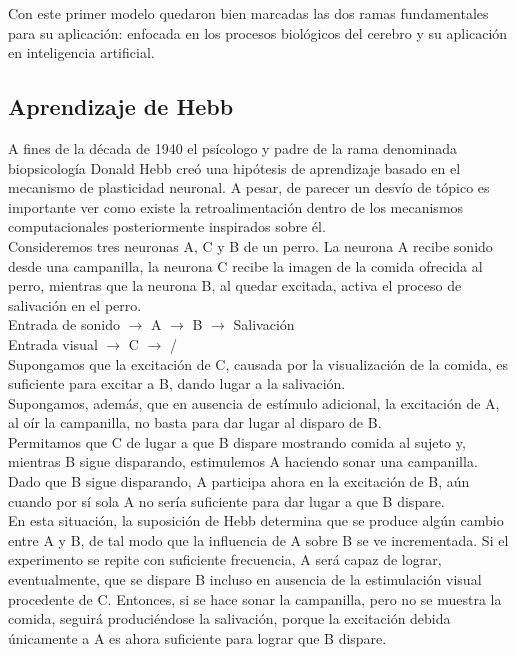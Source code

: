 \documentclass{llncs}
\begin{document}
Con este primer modelo quedaron bien marcadas las dos ramas fundamentales para su aplicaci\'on: enfocada en los
procesos biol\'ogicos del cerebro y su aplicaci\'on en inteligencia artificial. \\

\subsection{Aprendizaje de Hebb}

A fines de la d\'ecada de 1940 el ps\'icologo y padre de la rama denominada biopsicolog\'ia Donald Hebb cre\'o una hip\'otesis
de aprendizaje basado en el mecanismo de plasticidad neuronal. A pesar, de parecer un desv\'io de t\'opico es importante ver
como existe la retroalimentaci\'on dentro de los mecanismos computacionales posteriormente inspirados sobre \'el.\\

Consideremos tres neuronas A, C y B de un perro. La neurona A recibe sonido desde una campanilla, la neurona C recibe la
imagen de la comida ofrecida al perro, mientras que la neurona B, al quedar excitada, activa el proceso de salivaci\'on en el perro.\\

Entrada de sonido $\rightarrow$ A $\rightarrow$ B $\rightarrow$ Salivaci\'on\\

Entrada visual $\rightarrow$ C $\rightarrow$  /\\

Supongamos que la excitaci\'on de C, causada por la visualizaci\'on de la comida, es suficiente para excitar a B, dando lugar a la 
salivaci\'on. \\

Supongamos, adem\'as, que en ausencia de est\'imulo adicional, la excitaci\'on de A, al o\'ir la campanilla, no basta para dar lugar al
disparo de B.\\

Permitamos que C de lugar a que B dispare mostrando comida al sujeto y, mientras B sigue disparando, estimulemos A haciendo
sonar una campanilla. Dado que B sigue disparando, A participa ahora en la excitaci\'on de B, a\'un cuando por s\'i sola A no ser\'ia
suficiente para dar lugar a que B dispare.\\

En esta situaci\'on, la suposici\'on de Hebb determina que se produce alg\'un cambio entre A y B, de tal modo que la influencia de A
sobre B se ve incrementada. Si el experimento se repite con suficiente frecuencia, A ser\'a capaz de lograr, eventualmente, que se
dispare B incluso en ausencia de la estimulaci\'on visual procedente de C. Entonces, si se hace sonar la campanilla, pero no se muestra
la comida, seguir\'a produci\'endose la salivaci\'on, porque la excitaci\'on debida \'unicamente a A es ahora suficiente para lograr que
B dispare.\\
\end{document}
